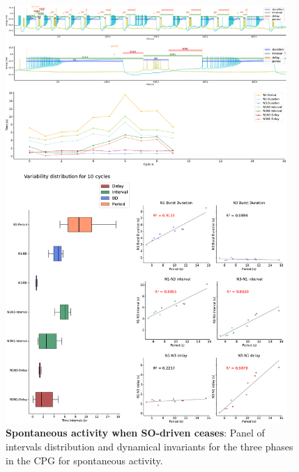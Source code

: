 \begin{figure}[htbp]
	\centering
	\includegraphics[width=0.95\textwidth]{./img/invariants/data/SUSSEX/prep4_so_no_driven/images/panel_with_intervals.pdf}
	\caption{\textbf{Spontaneous activity when SO-driven ceases}: Panel of intervals distribution and dynamical invariants for the three phases in the CPG for spontaneous activity.}
	\label{fig:no so spontaneous invariants}
\end{figure}
 


